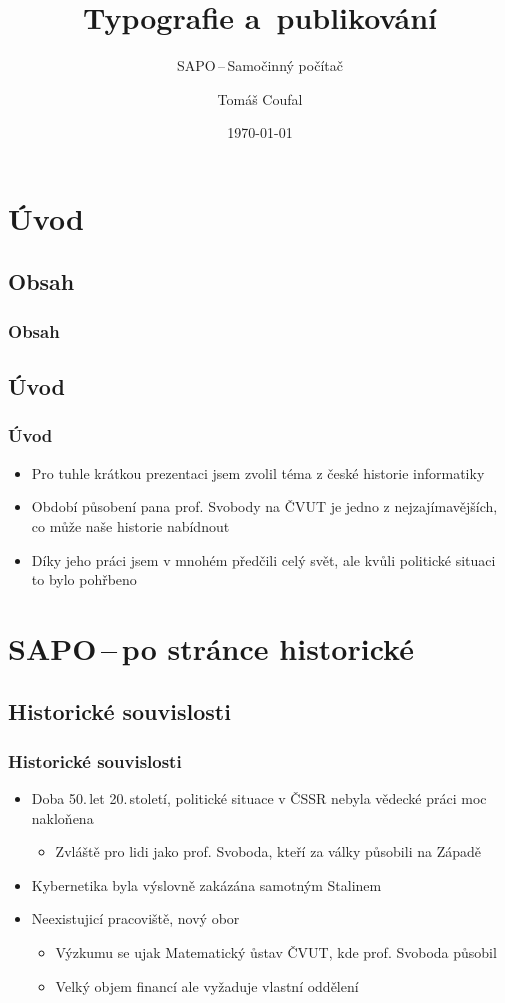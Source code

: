 \documentclass{beamer}
\title{Typografie a~publikování}
\subtitle{SAPO\,--\,Samočinný počítač}
\author{Tomáš Coufal}
\institute{Fakulta informačních technologií \\ Vysoké učení technické v~Brně}
\date{\today}
\begin{document}
\section{Úvod}
\frame{\titlepage}
\subsection{Obsah}
    \begin{frame}
        \frametitle{Obsah}
        \tableofcontents
    \end{frame}
\subsection{Úvod}
    \begin{frame}
      \frametitle{Úvod}
      \begin{itemize}
          \item Pro tuhle krátkou prezentaci jsem zvolil téma z české historie informatiky
          \item Období působení pana prof. Svobody na ČVUT je jedno z nejzajímavějších, co může naše historie nabídnout
          \item Díky jeho práci jsem v mnohém předčili celý svět, ale kvůli politické situaci to bylo pohřbeno
      \end{itemize}
    \end{frame}
\section{SAPO\,--\,po stránce historické}
\subsection{Historické souvislosti}
    \begin{frame}
        \frametitle{Historické souvislosti}
        \begin{itemize}
            \item Doba 50.\,let 20.\,století, politické situace v ČSSR nebyla vědecké práci moc nakloňena
                \begin{itemize}
                    \item Zvláště pro lidi jako prof. Svoboda, kteří za války působili na Západě
                \end{itemize}
            \item Kybernetika byla výslovně zakázána samotným Stalinem
            \item Neexistujicí pracoviště, nový obor
            \begin{itemize}
                \item Výzkumu se ujak Matematický ůstav ČVUT, kde prof. Svoboda působil
                \item Velký objem financí ale vyžaduje vlastní oddělení
            \end{itemize}
        \end{itemize}
    \end{frame}
\end{document}
